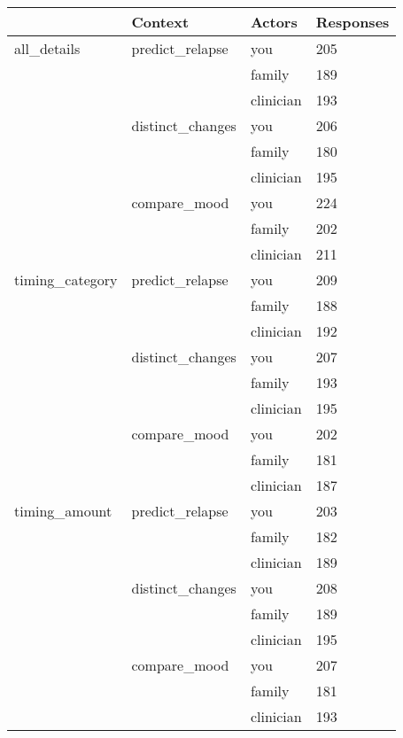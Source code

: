 \documentclass{article}
\begin{document}
\begin{table}[]
\begin{tabular}{|l|l|l|l|}
\hline
                 & Context           & Actors    & Responses \\ \hline
all\_details     & predict\_relapse  & you       & 205       \\ \hline
                 &                   & family    & 189       \\ \hline
                 &                   & clinician & 193       \\ \hline
                 & distinct\_changes & you       & 206       \\ \hline
                 &                   & family    & 180       \\ \hline
                 &                   & clinician & 195       \\ \hline
                 & compare\_mood     & you       & 224       \\ \hline
                 &                   & family    & 202       \\ \hline
                 &                   & clinician & 211       \\ \hline
timing\_category & predict\_relapse  & you       & 209       \\ \hline
                 &                   & family    & 188       \\ \hline
                 &                   & clinician & 192       \\ \hline
                 & distinct\_changes & you       & 207       \\ \hline
                 &                   & family    & 193       \\ \hline
                 &                   & clinician & 195       \\ \hline
                 & compare\_mood     & you       & 202       \\ \hline
                 &                   & family    & 181       \\ \hline
                 &                   & clinician & 187       \\ \hline
timing\_amount   & predict\_relapse  & you       & 203       \\ \hline
                 &                   & family    & 182       \\ \hline
                 &                   & clinician & 189       \\ \hline
                 & distinct\_changes & you       & 208       \\ \hline
                 &                   & family    & 189       \\ \hline
                 &                   & clinician & 195       \\ \hline
                 & compare\_mood     & you       & 207       \\ \hline
                 &                   & family    & 181       \\ \hline
                 &                   & clinician & 193       \\ \hline
\end{tabular}
\end{table}
\end{document}
